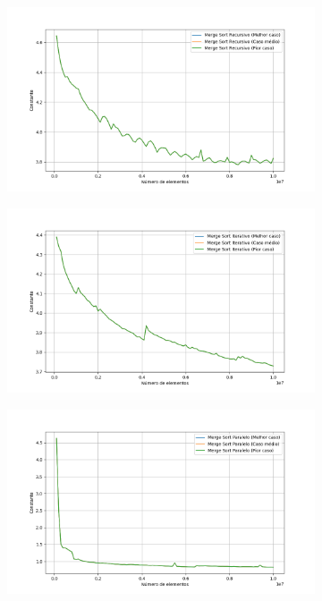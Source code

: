 \documentclass[12pt]{article}
\begin{document}
\begin{figure}[H]
    \caption{Constante do Merge Sort com dados aleatórios}
    \centering
    \begin{subfigure}{0.49\textwidth}
        \centering
        \includegraphics[width=\linewidth]{complexity_random_recursive_mergesort.png}
        \label{fig:imagem1}
    \end{subfigure}
    \hfill
    \begin{subfigure}{0.49\textwidth}
        \centering
        \includegraphics[width=\linewidth]{complexity_random_iterative_mergesort.png}
        \label{fig:imagem2}
    \end{subfigure}
    \begin{subfigure}{0.49\textwidth}
        \centering
        \includegraphics[width=\linewidth]{complexity_random_parallel_mergesort.png}
        \label{fig:imagem3}
    \end{subfigure}
    \label{fig:random_c}
\end{figure}
\end{document}
